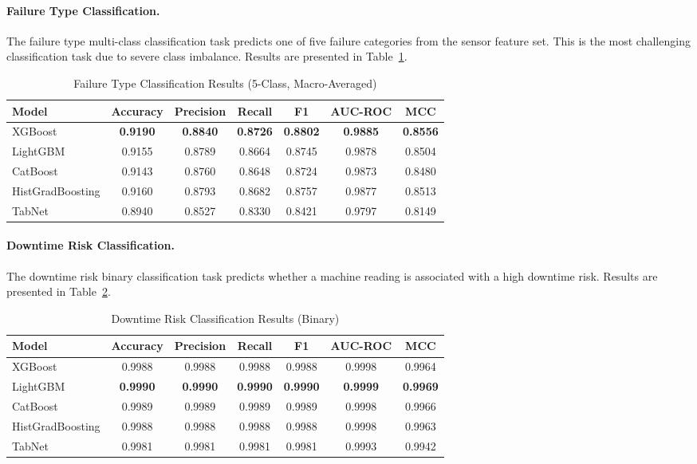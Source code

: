 \paragraph{Failure Type Classification.} The failure type multi-class classification task predicts one of five failure categories from the sensor feature set. This is the most challenging classification task due to severe class imbalance. Results are presented in Table~\ref{tab:cls_failure_type}.

\begin{table}[htbp]
\centering
\caption{Failure Type Classification Results (5-Class, Macro-Averaged)}
\label{tab:cls_failure_type}
\begin{tabular}{lcccccc}
\hline
\textbf{Model} & \textbf{Accuracy} & \textbf{Precision} & \textbf{Recall} & \textbf{F1} & \textbf{AUC-ROC} & \textbf{MCC} \\
\hline
XGBoost              & \textbf{0.9190} & \textbf{0.8840} & \textbf{0.8726} & \textbf{0.8802} & \textbf{0.9885} & \textbf{0.8556} \\
LightGBM             & 0.9155 & 0.8789 & 0.8664 & 0.8745 & 0.9878 & 0.8504 \\
CatBoost             & 0.9143 & 0.8760 & 0.8648 & 0.8724 & 0.9873 & 0.8480 \\
HistGradBoosting     & 0.9160 & 0.8793 & 0.8682 & 0.8757 & 0.9877 & 0.8513 \\
TabNet               & 0.8940 & 0.8527 & 0.8330 & 0.8421 & 0.9797 & 0.8149 \\
\hline
\end{tabular}
\end{table}

\paragraph{Downtime Risk Classification.} The downtime risk binary classification task predicts whether a machine reading is associated with a high downtime risk. Results are presented in Table~\ref{tab:cls_downtime_risk}.

\begin{table}[htbp]
\centering
\caption{Downtime Risk Classification Results (Binary)}
\label{tab:cls_downtime_risk}
\begin{tabular}{lcccccc}
\hline
\textbf{Model} & \textbf{Accuracy} & \textbf{Precision} & \textbf{Recall} & \textbf{F1} & \textbf{AUC-ROC} & \textbf{MCC} \\
\hline
XGBoost              & 0.9988 & 0.9988 & 0.9988 & 0.9988 & 0.9998 & 0.9964 \\
LightGBM             & \textbf{0.9990} & \textbf{0.9990} & \textbf{0.9990} & \textbf{0.9990} & \textbf{0.9999} & \textbf{0.9969} \\
CatBoost             & 0.9989 & 0.9989 & 0.9989 & 0.9989 & 0.9998 & 0.9966 \\
HistGradBoosting     & 0.9988 & 0.9988 & 0.9988 & 0.9988 & 0.9998 & 0.9963 \\
TabNet               & 0.9981 & 0.9981 & 0.9981 & 0.9981 & 0.9993 & 0.9942 \\
\hline
\end{tabular}
\end{table}

